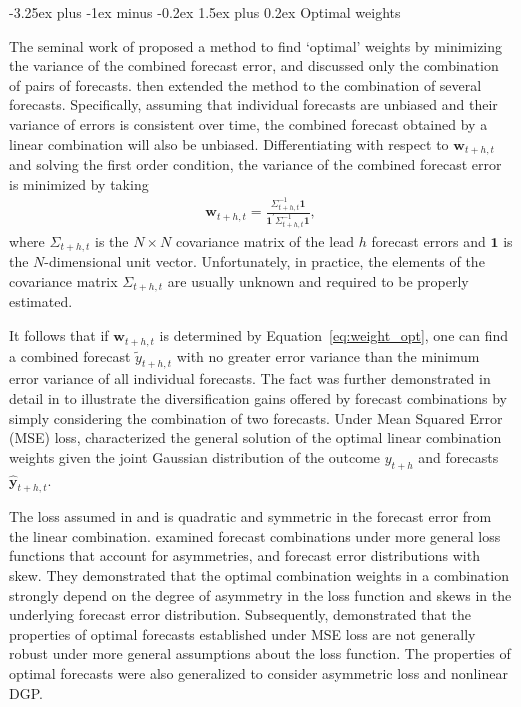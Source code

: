 \documentclass[11pt]{article}
\makeatletter
\renewcommand{\paragraph}{\@startsection{paragraph}{4}{0ex}%
   {-3.25ex plus -1ex minus -0.2ex}%
   {1.5ex plus 0.2ex}%
   {\normalfont\normalsize\bfseries}}
\makeatother
\begin{document}
\paragraph{Optimal weights}

The seminal work of \cite{Bates1969-yj} proposed a method to find `optimal' weights by minimizing the variance of the combined forecast error, and discussed only the combination of pairs of forecasts. \cite{Newbold1974-lp} then extended the method to the combination of several forecasts. Specifically, assuming that individual forecasts are unbiased and their variance of errors is consistent over time, the combined forecast obtained by a linear combination will also be unbiased. Differentiating with respect to $\boldsymbol{w}_{t+h, t}$ and solving the first order condition, the variance of the combined forecast error is minimized by taking
\begin{align}
\label{eq:weight_opt}
\boldsymbol{w}_{t+h, t}=\frac{\Sigma_{t+h, t}^{-1}\mathbf{1}}{\mathbf{1}^{\prime} \Sigma_{t+h, t}^{-1} \mathbf{1}},
\end{align}
where $\Sigma_{t+h, t}$ is the $N \times N$ covariance matrix of the lead $h$ forecast errors and $\mathbf{1}$ is the $N$-dimensional unit vector. Unfortunately, in practice, the elements of the covariance matrix $\Sigma_{t+h, t}$ are usually unknown and required to be properly estimated.

It follows that if $\boldsymbol{w}_{t+h, t}$ is determined by Equation~\eqref{eq:weight_opt}, one can find a combined forecast $\tilde{y}_{t+h, t}$ with no greater error variance than the minimum error variance of all individual forecasts. The fact was further demonstrated in detail in \cite{Timmermann2006-en} to illustrate the diversification gains offered by forecast combinations by simply considering the combination of two forecasts. Under Mean Squared Error (MSE) loss, \cite{Timmermann2006-en} characterized the general solution of the optimal linear combination weights given the joint Gaussian distribution of the outcome $y_{t+h}$ and forecasts $\hat{\mathbf{y}}_{t+h, t}$.

The loss assumed in \cite{Bates1969-yj} and \cite{Newbold1974-lp} is quadratic and symmetric in the forecast error from the linear combination. \cite{Elliott2004-dz} examined forecast combinations under more general loss functions that account for asymmetries, and forecast error distributions with skew. They demonstrated that the optimal combination weights in a combination strongly depend on the degree of asymmetry in the loss function and skews in the underlying forecast error distribution. Subsequently, \cite{Patton2007-zo} demonstrated that the properties of optimal forecasts established under MSE loss are not generally robust under more general assumptions about the loss function. The properties of optimal forecasts were also generalized to consider asymmetric loss and nonlinear DGP.
\end{document}
